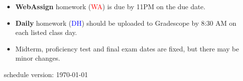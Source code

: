 \documentclass[12pt]{article}
\begin{document}
\begin{itemize}
\item \textbf{WebAssign} homework (\textcolor{red}{WA}) is due by 11PM on the due date.
\item \textbf{Daily} homework (\textcolor{blue}{DH}) should be uploaded to Gradescope by 8:30 AM on each listed class day.
\item Midterm, proficiency test and final exam dates are fixed, but there may be minor changes.
\end{itemize}



\vfill
\hfill \scriptsize schedule version: \today \normalsize
\end{document}
